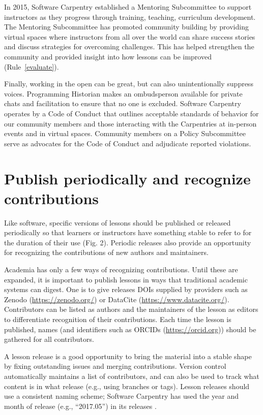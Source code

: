 \documentclass[10pt,letterpaper]{article}
\newcommand{\rulemajor}[2]{\section{#1}\label{#2}}
\newcommand{\ruleref}[1]{Rule~\ref{#1}}
\begin{document}
In 2015,
Software Carpentry established a Mentoring Subcommittee to support instructors
as they progress through training, teaching, curriculum development.
The Mentoring Subcommittee has promoted community building
by providing virtual spaces where instructors from all over the world can share success stories
and discuss strategies for overcoming challenges.
This has helped strengthen the community and provided insight into how lessons can be improved
(\ruleref{evaluate}).

Finally,
working in the open can be great,
but can also unintentionally suppress voices.
Programming Historian makes an ombudsperson available for private chats and facilitation
to ensure that no one is excluded.
Software Carpentry operates by a Code of Conduct that outlines acceptable standards of behavior for our community members
and those interacting with the Carpentries at in-person events and in virtual spaces.
Community members on a Policy Subcommittee serve as advocates for the Code of Conduct
and adjudicate reported violations.

\rulemajor{Publish periodically and recognize contributions}{publish}

Like software,
specific versions of lessons should be published or released periodically
so that learners or instructors have something stable to refer to for the duration of their use (Fig. 2).
Periodic releases also provide an opportunity
for recognizing the contributions of new authors and maintainers.

Academia has only a few ways of recognizing contributions.
Until these are expanded,
it is important to publish lessons in ways that traditional academic systems can digest.
One is to give releases DOIs supplied by providers such as Zenodo (\url{https://zenodo.org/})
or DataCite (\url{https://www.datacite.org/}).
Contributors can be listed as authors
and the maintainers of the lesson as editors
to differentiate recognition of their contributions.
Each time the lesson is published,
names (and identifiers such as ORCIDs (\url{https://orcid.org}))
should be gathered for all contributors.

A lesson release is a good opportunity to bring the material into a stable shape
by fixing outstanding issues and merging contributions.
Version control automatically maintains a list of contributors,
and can also be used to track what content is in what release
(e.g., using branches or tags).
Lesson releases should use a consistent naming scheme;
Software Carpentry has used the year and month of release
(e.g., ``2017.05'')
in its releases \cite{shell2015,shell2017}.
\end{document}

